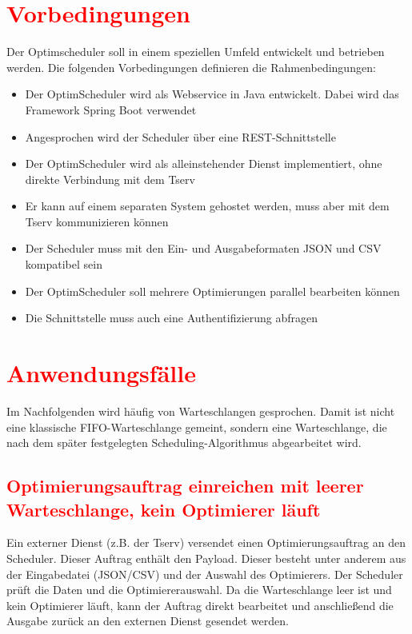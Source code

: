 \documentclass[
    12pt,               
    a4paper,            
    ngerman,            
    parskip=half,       
    headings=normal,   
    numbers=enddot,     
    toc=chapterentrywithdots 
]{scrreprt}\usepackage[utf8]{inputenc}
\begin{document}
\section{\textcolor{red}{Vorbedingungen}}
Der Optimscheduler soll in einem speziellen Umfeld entwickelt und betrieben werden. Die folgenden Vorbedingungen definieren die Rahmenbedingungen:

\begin{itemize}
    \item Der OptimScheduler wird als Webservice in Java entwickelt. Dabei wird das Framework Spring Boot \citep[Vgl.]{springboot2024} verwendet
    \item Angesprochen wird der Scheduler über eine REST-Schnittstelle
    \item Der OptimScheduler wird als alleinstehender Dienst implementiert, ohne direkte Verbindung mit dem Tserv
    \item Er kann auf einem separaten System gehostet werden, muss aber mit dem Tserv kommunizieren können
    \item Der Scheduler muss mit den Ein- und Ausgabeformaten JSON und CSV kompatibel sein
    \item Der OptimScheduler soll mehrere Optimierungen parallel bearbeiten können
    \item Die Schnittstelle muss auch eine Authentifizierung abfragen
\end{itemize}

\section{\textcolor{red}{Anwendungsfälle}}
Im Nachfolgenden wird häufig von Warteschlangen gesprochen. Damit ist nicht eine klassische FIFO-Warteschlange gemeint, sondern eine Warteschlange, die nach dem später festgelegten Scheduling-Algorithmus abgearbeitet wird.

\subsection{\textcolor{red}{Optimierungsauftrag einreichen mit leerer Warteschlange, kein Optimierer läuft}}
Ein externer Dienst (z.B. der Tserv) versendet einen Optimierungsauftrag an den Scheduler. Dieser Auftrag enthält den Payload. Dieser besteht unter anderem aus der Eingabedatei (JSON/CSV) und der Auswahl des Optimierers. Der Scheduler prüft die Daten und die Optimiererauswahl. Da die Warteschlange leer ist und kein Optimierer läuft, kann der Auftrag direkt bearbeitet und anschließend die Ausgabe zurück an den externen Dienst gesendet werden.
\end{document}
